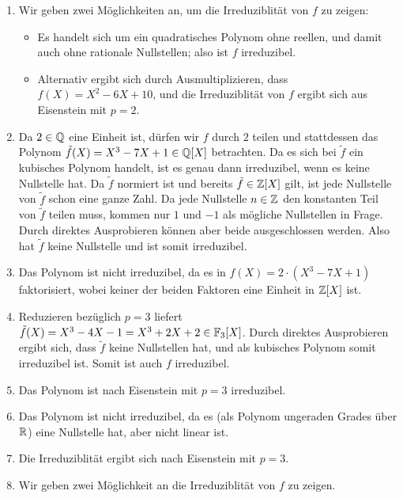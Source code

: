 \begin{solution}
  \begin{enumerate}
    \item
      Wir geben zwei Möglichkeiten an, um die Irreduziblität von $f$ zu zeigen:
      \begin{itemize}
        \item
          Es handelt sich um ein quadratisches Polynom ohne reellen, und damit auch ohne rationale Nullstellen;
          also ist $f$ irreduzibel.
        \item
          Alternativ ergibt sich durch Ausmultiplizieren, dass $f(X) = X^2 - 6X + 10$, und die Irreduziblität von $f$ ergibt sich aus Eisenstein mit $p = 2$.
      \end{itemize}
    \item
      Da $2 \in \mathbb{Q}$ eine Einheit ist, dürfen wir $f$ durch $2$ teilen und stattdessen das Polynom $\tilde{f}(X) = X^3 - 7X + 1 \in \mathbb{Q}[X]$ betrachten.
      Da es sich bei $\tilde{f}$ ein kubisches Polynom handelt, ist es genau dann irreduzibel, wenn es keine Nullstelle hat.
      Da $\tilde{f}$ normiert ist und bereits $\tilde{f} \in \mathbb{Z}[X]$ gilt, ist jede Nullstelle von $\tilde{f}$ schon eine ganze Zahl.
      Da jede Nullstelle $n \in \mathbb{Z}$ den konstanten Teil von $\tilde{f}$ teilen muss, kommen nur $1$ und $-1$ als mögliche Nullstellen in Frage. Durch direktes Ausprobieren können aber beide ausgeschlossen werden.
      Also hat $\tilde{f}$ keine Nullstelle und ist somit irreduzibel.
    \item
      Das Polynom ist nicht irreduzibel, da es in $f(X) = 2 \cdot (X^3 - 7X + 1)$ faktorisiert, wobei keiner der beiden Faktoren eine Einheit in $\mathbb{Z}[X]$ ist.
    \item
      Reduzieren bezüglich $p = 3$ liefert $\tilde{f}(X) = X^3 - 4X - 1 = X^3 + 2X + 2 \in \mathbb{F}_3[X]$.
      Durch direktes Ausprobieren ergibt sich, dass $\tilde{f}$ keine Nullstellen hat, und als kubisches Polynom somit irreduzibel ist.
      Somit ist auch $f$ irreduzibel.
    \item
      Das Polynom ist nach Eisenstein mit $p = 3$ irreduzibel.
    \item
      Das Polynom ist nicht irreduzibel, da es (als Polynom ungeraden Grades über $\mathbb{R}$) eine Nullstelle hat, aber nicht linear ist.
    \item
      Die Irreduziblität ergibt sich nach Eisenstein mit $p = 3$.
    \item
      Wir geben zwei Möglichkeit an die Irreduziblität von $f$ zu zeigen.

\end{enumerate}
\end{solution}
